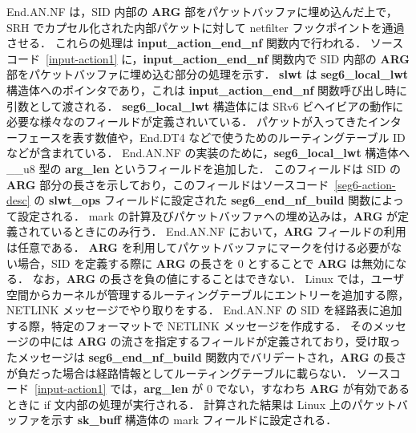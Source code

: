 End.AN.NF は，SID 内部の \textbf{ARG} 部をパケットバッファに埋め込んだ上で，SRH でカプセル化された内部パケットに対して netfilter フックポイントを通過させる．
これらの処理は \textbf{input\_action\_end\_nf} 関数内で行われる．
ソースコード~\ref*{input-action1} に，\textbf{input\_action\_end\_nf} 関数内で SID 内部の \textbf{ARG} 部をパケットバッファに埋め込む部分の処理を示す．
\textbf{slwt} は \textbf{seg6\_local\_lwt} 構造体へのポインタであり，これは \textbf{input\_action\_end\_nf} 関数呼び出し時に引数として渡される．
\textbf{seg6\_local\_lwt} 構造体には SRv6 ビヘイビアの動作に必要な様々なのフィールドが定義されいている．
パケットが入ってきたインターフェースを表す数値や，End.DT4 などで使うためのルーティングテーブル ID などが含まれている．
End.AN.NF の実装のために，\textbf{seg6\_local\_lwt} 構造体へ \_\_u8 型の \textbf{arg\_len} というフィールドを追加した．
このフィールドは SID の \textbf{ARG} 部分の長さを示しており，このフィールドはソースコード~\ref*{seg6-action-desc} の \textbf{slwt\_ops} フィールドに設定された \textbf{seg6\_end\_nf\_build} 関数によって設定される．
mark の計算及びパケットバッファへの埋め込みは，\textbf{ARG} が定義されているときにのみ行う．
End.AN.NF において，\textbf{ARG} フィールドの利用は任意である．
\textbf{ARG} を利用してパケットバッファにマークを付ける必要がない場合，SID を定義する際に \textbf{ARG} の長さを $0$ とすることで \textbf{ARG} は無効になる．
なお，\textbf{ARG} の長さを負の値にすることはできない．
Linux では，ユーザ空間からカーネルが管理するルーティングテーブルにエントリーを追加する際，NETLINK メッセージでやり取りをする．
End.AN.NF の SID を経路表に追加する際，特定のフォーマットで NETLINK メッセージを作成する．
そのメッセージの中には \textbf{ARG} の流さを指定するフィールドが定義されており，受け取ったメッセージは \textbf{seg6\_end\_nf\_build} 関数内でバリデートされ，\textbf{ARG} の長さが負だった場合は経路情報としてルーティングテーブルに載らない．
ソースコード~\ref*{input-action1} では，\textbf{arg\_len} が $0$ でない，すなわち \textbf{ARG} が有効であるときに if 文内部の処理が実行される．
計算された結果は Linux 上のパケットバッファを示す \textbf{sk\_buff} 構造体の mark フィールドに設定される．

